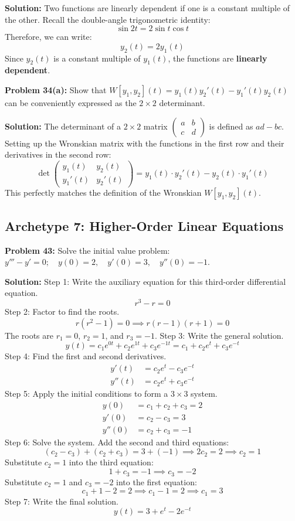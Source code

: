\documentclass[12pt]{article}
\begin{document}
\textbf{Solution:}
Two functions are linearly dependent if one is a constant multiple of the other. Recall the double-angle trigonometric identity:
\[ \sin 2t = 2 \sin t \cos t \]
Therefore, we can write:
\[ y_2(t) = 2 y_1(t) \]
Since $y_2(t)$ is a constant multiple of $y_1(t)$, the functions are \textbf{linearly dependent}.

\textbf{Problem 34(a):} Show that $W[y_1, y_2](t) = y_1(t)y_2'(t) - y_1'(t)y_2(t)$ can be conveniently expressed as the $2 \times 2$ determinant.

\textbf{Solution:}
The determinant of a $2 \times 2$ matrix $\begin{pmatrix} a & b \\ c & d \end{pmatrix}$ is defined as $ad - bc$.
Setting up the Wronskian matrix with the functions in the first row and their derivatives in the second row:
\[ \det \begin{pmatrix} y_1(t) & y_2(t) \\ y_1'(t) & y_2'(t) \end{pmatrix} = y_1(t) \cdot y_2'(t) - y_2(t) \cdot y_1'(t) \]
This perfectly matches the definition of the Wronskian $W[y_1, y_2](t)$.

\subsection{Archetype 7: Higher-Order Linear Equations}
\textbf{Problem 43:} Solve the initial value problem: $y''' - y' = 0; \quad y(0) = 2, \quad y'(0) = 3, \quad y''(0) = -1$.

\textbf{Solution:}
Step 1: Write the auxiliary equation for this third-order differential equation.
\[ r^3 - r = 0 \]
Step 2: Factor to find the roots.
\[ r(r^2 - 1) = 0 \implies r(r - 1)(r + 1) = 0 \]
The roots are $r_1 = 0$, $r_2 = 1$, and $r_3 = -1$.
Step 3: Write the general solution.
\[ y(t) = c_1 e^{0t} + c_2 e^{1t} + c_3 e^{-1t} = c_1 + c_2 e^t + c_3 e^{-t} \]
Step 4: Find the first and second derivatives.
\begin{align*}
    y'(t) &= c_2 e^t - c_3 e^{-t} \\
    y''(t) &= c_2 e^t + c_3 e^{-t}
\end{align*}
Step 5: Apply the initial conditions to form a $3 \times 3$ system.
\begin{align*}
    y(0) &= c_1 + c_2 + c_3 = 2 \\
    y'(0) &= c_2 - c_3 = 3 \\
    y''(0) &= c_2 + c_3 = -1
\end{align*}
Step 6: Solve the system. Add the second and third equations:
\[ (c_2 - c_3) + (c_2 + c_3) = 3 + (-1) \implies 2c_2 = 2 \implies c_2 = 1 \]
Substitute $c_2 = 1$ into the third equation:
\[ 1 + c_3 = -1 \implies c_3 = -2 \]
Substitute $c_2 = 1$ and $c_3 = -2$ into the first equation:
\[ c_1 + 1 - 2 = 2 \implies c_1 - 1 = 2 \implies c_1 = 3 \]
Step 7: Write the final solution.
\[ y(t) = 3 + e^t - 2e^{-t} \]
\end{document}
